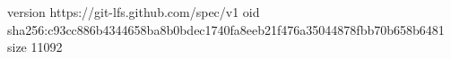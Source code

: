 version https://git-lfs.github.com/spec/v1
oid sha256:c93cc886b4344658ba8b0bdec1740fa8eeb21f476a35044878fbb70b658b6481
size 11092
